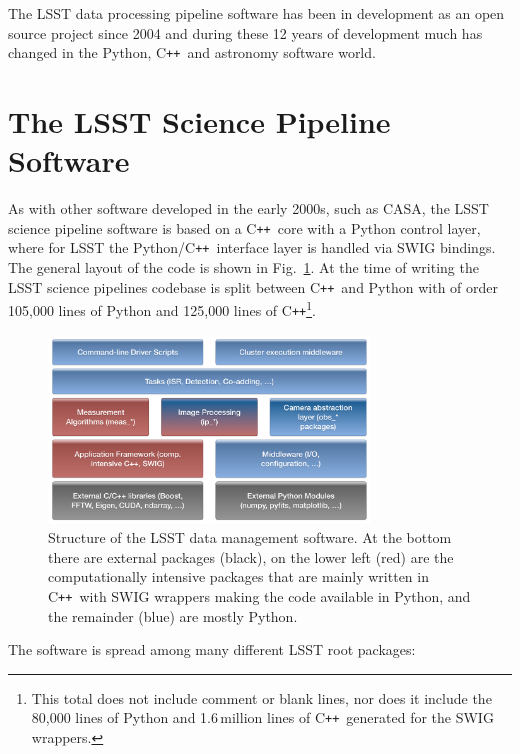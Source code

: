 \documentclass[]{spie}  %
\newcommand{\CPP}{C\texttt{++}\xspace}  %
\begin{document}
The LSST data processing pipeline software has been in development as an open source project since 2004\cite{2004AAS...20510811A,2010SPIE.7740E..15A,2016_adassxxv_P056} and during these 12 years of development much has changed in the Python, \CPP\ and astronomy software world.


\section{The LSST Science Pipeline Software}

As with other software developed in the early 2000s, such as CASA\cite{2012ASPC..461..849P}, the LSST science pipeline software is based on a \CPP\ core with a Python control layer, where for LSST the Python/\CPP\ interface layer is handled via SWIG\cite{beazley2003automated} bindings.
The general layout of the code is shown in Fig.~\ref{fig:layers}.
At the time of writing the LSST science pipelines codebase is split between \CPP\ and Python with of order 105,000 lines of Python and 125,000 lines of \CPP\footnote{This total does not include comment or blank lines, nor does it include the 80,000 lines of Python and 1.6\,million lines of \CPP\ generated for the SWIG wrappers.}.

\begin{figure} [t]
\begin{center}
\includegraphics[height=5cm]{Software-Layers}
\end{center}
\caption[layers]
{\label{fig:layers}
Structure of the LSST data management software.
At the bottom there are external packages (black), on the lower left (red) are the computationally intensive packages that are mainly written in \CPP\ with SWIG wrappers making the code available in Python, and the remainder (blue) are mostly Python.}
\end{figure}

The software is spread among many different LSST root packages:
\end{document}
